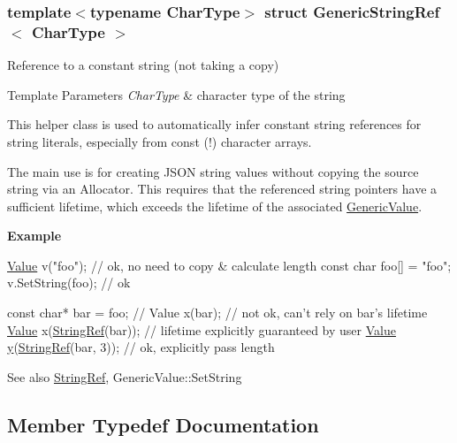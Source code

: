 \subsubsection*{template$<$typename Char\+Type$>$\newline
struct Generic\+String\+Ref$<$ Char\+Type $>$}

Reference to a constant string (not taking a copy) 


\begin{DoxyTemplParams}{Template Parameters}
{\em Char\+Type} & character type of the string\\
\hline
\end{DoxyTemplParams}
This helper class is used to automatically infer constant string references for string literals, especially from {\ttfamily const} {\bfseries }(!) character arrays.

The main use is for creating J\+S\+ON string values without copying the source string via an Allocator. This requires that the referenced string pointers have a sufficient lifetime, which exceeds the lifetime of the associated \hyperlink{classGenericValue}{Generic\+Value}.

{\bfseries Example} 
\begin{DoxyCode}
\hyperlink{classGenericValue}{Value} v(\textcolor{stringliteral}{"foo"});   \textcolor{comment}{// ok, no need to copy & calculate length}
\textcolor{keyword}{const} \textcolor{keywordtype}{char} foo[] = \textcolor{stringliteral}{"foo"};
v.SetString(foo); \textcolor{comment}{// ok}

\textcolor{keyword}{const} \textcolor{keywordtype}{char}* bar = foo;
\textcolor{comment}{// Value x(bar); // not ok, can't rely on bar's lifetime}
\hyperlink{classGenericValue}{Value} x(\hyperlink{structGenericStringRef_aa6b9fd9f6aa49405a574c362ba9af6b5}{StringRef}(bar)); \textcolor{comment}{// lifetime explicitly guaranteed by user}
\hyperlink{classGenericValue}{Value} \hyperlink{imgui__impl__opengl3__loader_8h_a5e247fc24ceb70d83f6ad59149b8910a}{y}(\hyperlink{structGenericStringRef_aa6b9fd9f6aa49405a574c362ba9af6b5}{StringRef}(bar, 3));  \textcolor{comment}{// ok, explicitly pass length}
\end{DoxyCode}


\begin{DoxySeeAlso}{See also}
\hyperlink{structGenericStringRef_aa6b9fd9f6aa49405a574c362ba9af6b5}{String\+Ref}, Generic\+Value\+::\+Set\+String 
\end{DoxySeeAlso}


\subsection{Member Typedef Documentation}
\mbox{\label{structGenericStringRef_a16908c3fce41be380061330c14ba2140}} 

